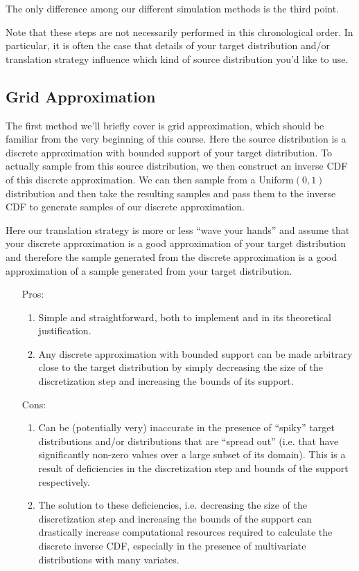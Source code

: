 \documentclass{article}
\begin{document}
The only difference among our different simulation methods is the third point.

Note that these steps are not necessarily performed in this chronological order.
In particular, it is often the case that details of your target distribution and/or translation strategy influence which kind of source distribution you'd like to use.

\subsection{Grid Approximation}

The first method we'll briefly cover is grid approximation, which should be familiar from the very beginning of this course.
Here the source distribution is a discrete approximation with bounded support of your target distribution.
To actually sample from this source distribution, we then construct an inverse CDF of this discrete approximation.
We can then sample from a $\text{Uniform}(0, 1)$ distribution and then take the resulting samples and pass them to the inverse CDF to generate samples of our discrete approximation.

Here our translation strategy is more or less ``wave your hands'' and assume that your discrete approximation is a good approximation of your target distribution and therefore the sample generated from the discrete approximation is a good approximation of a sample generated from your target distribution.

\begin{itemize}
	\item[Pros:]
		\begin{enumerate}
			\item 
				Simple and straightforward, both to implement and in its theoretical justification.
			\item
				Any discrete approximation with bounded support can be made arbitrary close to the target distribution by simply decreasing the size of the discretization step and increasing the bounds of its support.
		\end{enumerate}
	\item[Cons:]
		\begin{enumerate}
			\item 
				Can be (potentially very) inaccurate in the presence of ``spiky'' target distributions and/or distributions that are ``spread out'' (i.e. that have significantly non-zero values over a large subset of its domain).
				This is a result of deficiencies in the discretization step and bounds of the support respectively.
			\item
				The solution to these deficiencies, i.e. decreasing the size of the discretization step and increasing the bounds of the support can drastically increase computational resources required to calculate the discrete inverse CDF, especially in the presence of multivariate distributions with many variates.
		\end{enumerate}
\end{itemize}
\end{document}
